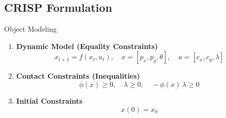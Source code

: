 \documentclass[10pt, aspectratio=169]{beamer}
\begin{document}
\subsection{CRISP Formulation}
\begin{frame}{Object Modeling}
    \begin{enumerate}
        \item \textbf{Dynamic Model (Equality Constraints)}  
        \[
          x_{t+1} = f(x_t, u_t), \quad 
          x = [p_x, p_y, \theta], \quad 
          u = [c_x, c_y, \lambda]
        \]  
      \vspace{1.5em}
        
        \item \textbf{Contact Constraints (Inequalities)}  
        \[
          \phi(x) \geq 0, \quad 
          \lambda \geq 0, \quad 
          -\phi(x)\,\lambda \geq 0
        \]  
      \vspace{1.5em}
        
        \item \textbf{Initial Constraints}  
        \[ x(0) = x_0 \]  
    \end{enumerate}

\end{frame}
\end{document}
